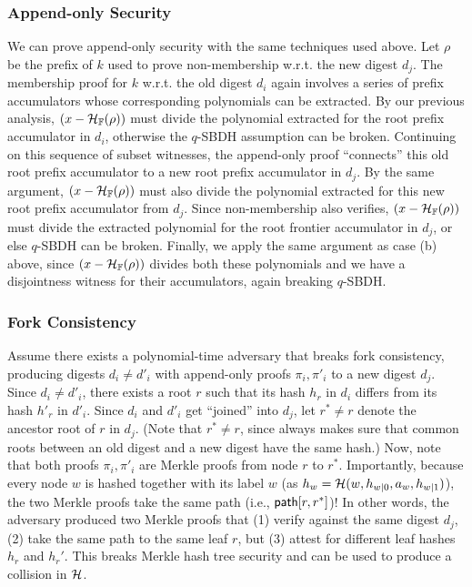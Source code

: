 \subsubsection{Append-only Security}
\label{s:aas:from-bilinear-acc:proofs:append-only-security}
We can prove append-only security with the same techniques used above. 
Let $\rho$ be the prefix of $k$ used to prove non-membership w.r.t. the new digest $d_{j}$.
The membership proof for $k$ w.r.t. the old digest $d_i$ again involves a series of prefix accumulators whose corresponding polynomials can be extracted.
By our previous analysis, $(x-\mathcal{H}_{\mathbb{F}}(\rho))$ must divide the polynomial extracted for the root prefix accumulator in $d_i$, otherwise the $q$-SBDH assumption can be broken.
Continuing on this sequence of subset witnesses, the append-only proof ``connects'' this old root prefix accumulator to a new root prefix accumulator in $d_{j}$.
By the same argument, $(x-\mathcal{H}_{\mathbb{F}}(\rho))$ must also divide the polynomial extracted for this new root prefix accumulator from $d_j$.
Since non-membership also verifies, $(x-\mathcal{H}_{\mathbb{F}}(\rho))$ must divide the extracted polynomial for the root frontier accumulator in $d_{j}$, or else $q$-SBDH can be broken.
Finally, we apply the same argument as case (b) above, since $(x-\mathcal{H}_{\mathbb{F}}(\rho))$ divides both these polynomials and we have a disjointness witness for their accumulators, again breaking $q$-SBDH.

\subsubsection{Fork Consistency}
\label{s:aas:from-bilinear-acc:proofs:fork-consistency}
Assume there exists a polynomial-time adversary \Adv that breaks fork consistency, producing digests $d_i\ne d'_i$ with append-only proofs $\pi_i,\pi'_i$ to a new digest $d_j$.
Since $d_i\ne d'_i$, there exists a root $r$ such that its hash $h_r$ in $d_i$ differs from its hash $h'_r$ in $d'_i$. %
Since $d_i$ and $d'_i$ get ``joined'' into $d_j$, let $r^*\neq r$ denote the ancestor root of $r$ in $d_j$.
(Note that $r^* \neq r$, since \verappendonly always makes sure that common roots between an old digest and a new digest have the same hash.) 
Now, note that both proofs $\pi_i,\pi'_i$ are Merkle proofs from node $r$ to $r^*$.
Importantly, because every node $w$ is hashed together with its label $w$ (as $h_w = \mathcal{H}(w,h_{w|0},a_w,h_{w|1})$), the two Merkle proofs take the same path (i.e., $\mathsf{path}[r,r^*]$)!
In other words, the adversary produced two Merkle proofs that (1) verify against the same digest $d_j$, (2) take the same path to the same leaf $r$, but (3) attest for different leaf hashes $h_r$ and $h_r'$.
This breaks Merkle hash tree security and can be used to produce a collision in $\mathcal{H}$.

\endgroup